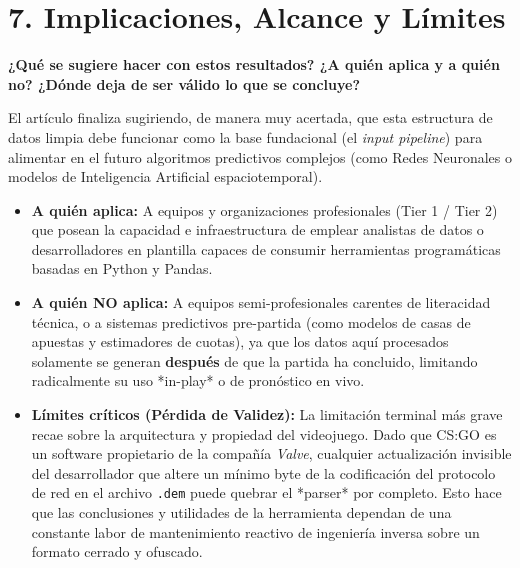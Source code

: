 \documentclass[12pt,a4paper]{article}
\begin{document}
\section*{7. Implicaciones, Alcance y Límites}
\textbf{¿Qué se sugiere hacer con estos resultados? ¿A quién aplica y a quién no? ¿Dónde deja de ser válido lo que se concluye?}

El artículo finaliza sugiriendo, de manera muy acertada, que esta estructura de datos limpia debe funcionar como la base fundacional (el \textit{input pipeline}) para alimentar en el futuro algoritmos predictivos complejos (como Redes Neuronales o modelos de Inteligencia Artificial espaciotemporal).

\begin{itemize}
    \item \textbf{A quién aplica:} A equipos y organizaciones profesionales (Tier 1 / Tier 2) que posean la capacidad e infraestructura de emplear analistas de datos o desarrolladores en plantilla capaces de consumir herramientas programáticas basadas en Python y Pandas.
    \item \textbf{A quién NO aplica:} A equipos semi-profesionales carentes de literacidad técnica, o a sistemas predictivos pre-partida (como modelos de casas de apuestas y estimadores de cuotas), ya que los datos aquí procesados solamente se generan \textbf{después} de que la partida ha concluido, limitando radicalmente su uso *in-play* o de pronóstico en vivo.
    \item \textbf{Límites críticos (Pérdida de Validez):} La limitación terminal más grave recae sobre la arquitectura y propiedad del videojuego. Dado que CS:GO es un software propietario de la compañía \textit{Valve}, cualquier actualización invisible del desarrollador que altere un mínimo byte de la codificación del protocolo de red en el archivo \texttt{.dem} puede quebrar el *parser* por completo. Esto hace que las conclusiones y utilidades de la herramienta dependan de una constante labor de mantenimiento reactivo de ingeniería inversa sobre un formato cerrado y ofuscado.
\end{itemize}
\end{document}
